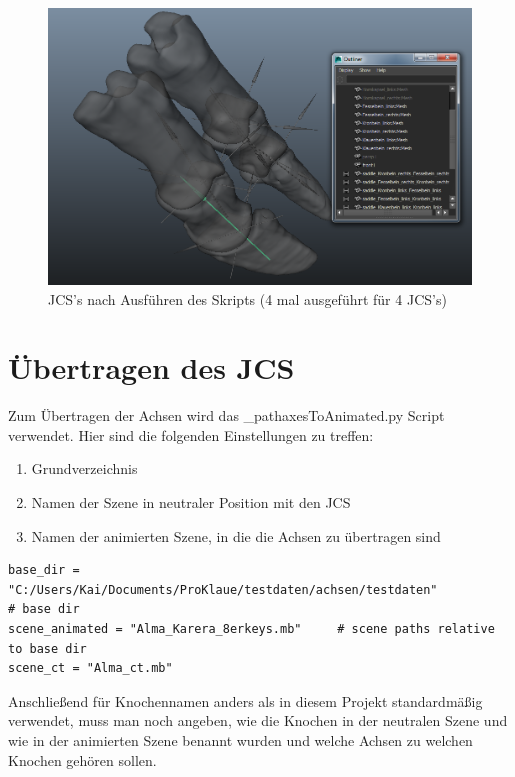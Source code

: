 \documentclass[a4paper, openany, oneside]{memoir}
\begin{document}
\begin{figure}
\begin{center}
\includegraphics[width = \textwidth, height = 0.4\textheight, keepaspectratio]{img_achsen}
\caption{JCS's nach Ausführen des Skripts (4 mal ausgeführt für 4 JCS's)}
\label{fig:achsen}
\end{center}
\end{figure}

\section{Übertragen des JCS}
Zum Übertragen der Achsen wird das \File_path{axesToAnimated.py} Script verwendet.
Hier sind die folgenden Einstellungen zu treffen:
\begin{enumerate}
\item Grundverzeichnis
\item Namen der Szene in neutraler Position mit den JCS
\item Namen der animierten Szene, in die die Achsen zu übertragen sind
\end{enumerate}

\begin{minipage}[c]{\textwidth}
\begin{lstlisting}
base_dir = "C:/Users/Kai/Documents/ProKlaue/testdaten/achsen/testdaten"           # base dir
scene_animated = "Alma_Karera_8erkeys.mb"     # scene paths relative to base dir
scene_ct = "Alma_ct.mb"
\end{lstlisting}
\end{minipage}

Anschließend für Knochennamen anders als in diesem Projekt standardmäßig verwendet, muss man noch angeben, wie die Knochen in der neutralen Szene und wie in der animierten Szene benannt wurden und welche Achsen zu welchen Knochen gehören sollen.
\end{document}
